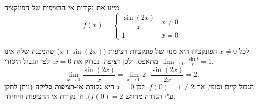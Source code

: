 
\begin{question}
מיינו את נקודות אי הרציפות של הפונקציה
\[ f(x)=\begin{cases} \dfrac{\sin(2x)}{x} & x\neq 0\\[2mm] 1 & x=0 \end{cases} \]
\end{question}

\begin{solution}
לכל $x\neq 0$ הפונקציה היא מנה של פונקציות רציפות ($\sin(2x)$ ו-$x$) שהמכנה שלה אינו מתאפס, ולכן רציפה. נבדוק את $x=0$: לפי הגבול היסודי $\lim_{t\to0}\frac{\sin t}{t}=1$,
\[ \lim_{x\to0}\frac{\sin(2x)}{x}=\lim_{x\to0}2\cdot\frac{\sin(2x)}{2x}=2. \]
הגבול קיים וסופי, אך $f(0)=1\neq 2$. לכן $x=0$ היא \textbf{נקודת אי-רציפות סליקה} (ניתן לתקן ע"י הגדרה מחדש $f(0)=2$), וזו נקודת אי-הרציפות היחידה.
\end{solution}
